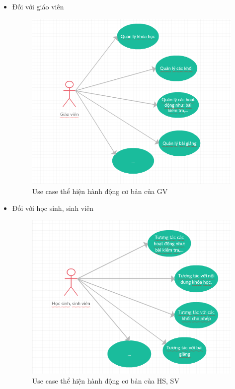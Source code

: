 \begin{itemize}
	\item Đối với giáo viên
	\begin{center}
		\begin{figure}[htp]
			\begin{center}
				\includegraphics[scale=0.7]{img/usecasegv}
			\end{center}
			\caption{Use case thể hiện hành động cơ bản của GV}
			\label{refhinh10}
		\end{figure}
	\end{center}
	\vskip 1cm 
	\item Đối với học sinh, sinh viên
	\begin{center}
		\begin{figure}[htp]
			\begin{center}
				\includegraphics[scale=0.7]{img/usecasehs}
			\end{center}
			\caption{Use case thể hiện hành động cơ bản của HS, SV}
			\label{refhinh11}
		\end{figure}
	\end{center}
\end{itemize}


